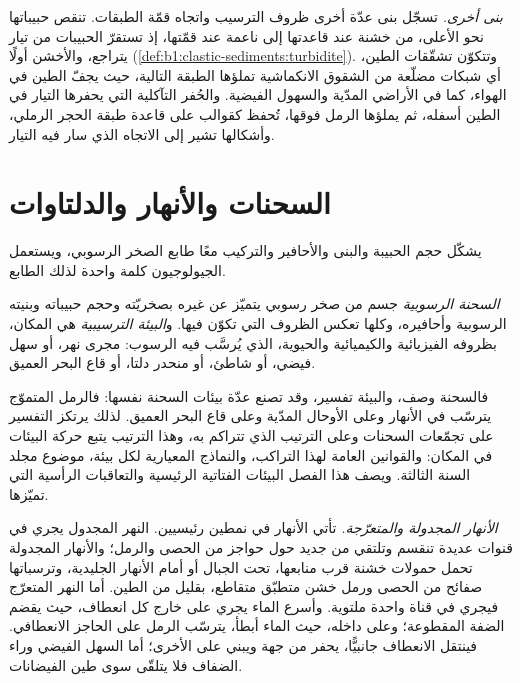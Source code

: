\emph{بنى أخرى.} تسجّل بنى عدّة أخرى ظروف الترسيب واتجاه قمّة الطبقات.  تنقص حبيباتها نحو الأعلى، من خشنة عند قاعدتها إلى ناعمة عند قمّتها، إذ تستقرّ الحبيبات من تيار يتراجع، والأخشن أولًا (\cref{def:b1:clastic-sediments:turbidite}). وتتكوّن تشقّقات الطين، أي شبكات مضلّعة من الشقوق الانكماشية تملؤها الطبقة التالية، حيث يجفّ الطين في الهواء، كما في الأراضي المدّية والسهول الفيضية. والحُفر التآكلية التي يحفرها التيار في الطين أسفله، ثم يملؤها الرمل فوقها، تُحفظ كقوالب على قاعدة طبقة الحجر الرملي، وأشكالها تشير إلى الاتجاه الذي سار فيه التيار.

\section{السحنات والأنهار والدلتاوات}\label{sec:b1:clastic-sediments:rivers-deltas}

يشكّل حجم الحبيبة  والبنى والأحافير والتركيب معًا طابع الصخر الرسوبي، ويستعمل الجيولوجيون كلمة واحدة لذلك الطابع.

\begin{definition}\label{def:b1:clastic-sediments:facies}
\emph{السحنة الرسوبية} جسم من صخر رسوبي يتميّز عن غيره بصخريّته وحجم حبيباته وبنيته الرسوبية وأحافيره، وكلها تعكس الظروف التي تكوّن فيها. و\emph{البيئة الترسيبية} هي المكان، بظروفه الفيزيائية والكيميائية والحيوية، الذي يُرسَّب فيه الرسوب: مجرى نهر، أو سهل فيضي، أو شاطئ، أو منحدر دلتا، أو قاع البحر العميق.
\end{definition}

فالسحنة وصف، والبيئة تفسير، وقد تصنع عدّة بيئات السحنة نفسها: فالرمل المتموّج يترسّب في الأنهار وعلى الأوحال المدّية وعلى قاع البحر العميق. لذلك يرتكز التفسير على تجمّعات السحنات وعلى الترتيب الذي تتراكم به، وهذا الترتيب يتبع حركة البيئات في المكان: والقوانين العامة لهذا التراكب، والنماذج المعيارية لكل بيئة، موضوع مجلد السنة الثالثة. ويصف هذا الفصل البيئات الفتاتية الرئيسية والتعاقبات الرأسية التي تميّزها.

\emph{الأنهار المجدولة والمتعرّجة.} تأتي الأنهار في نمطين رئيسيين. النهر المجدول يجري في قنوات عديدة تنقسم وتلتقي من جديد حول حواجز من الحصى والرمل؛ والأنهار المجدولة تحمل حمولات خشنة قرب منابعها، تحت الجبال أو أمام الأنهار الجليدية، وترسباتها صفائح من الحصى ورمل خشن متطبّق متقاطع، بقليل من الطين. أما النهر المتعرّج فيجري في قناة واحدة ملتوية. وأسرع الماء يجري على خارج كل انعطاف، حيث يقضم الضفة المقطوعة؛ وعلى داخله، حيث الماء أبطأ، يترسّب الرمل على الحاجز الانعطافي. فينتقل الانعطاف جانبيًّا، يحفر من جهة ويبني على الأخرى؛ أما السهل الفيضي وراء الضفاف فلا يتلقّى سوى طين الفيضانات.

